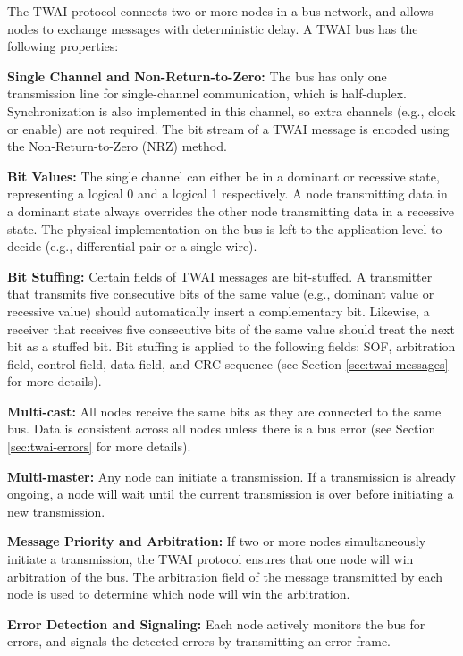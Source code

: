 \documentclass[main\_\_EN.tex]{subfiles}
\begin{document}
The TWAI protocol connects two or more nodes in a bus network, and allows nodes to exchange messages with deterministic delay. A TWAI bus has the following properties:

{\bfseries Single Channel and Non-Return-to-Zero:} The bus has only one transmission line for single-channel communication, which is half-duplex. Synchronization is also implemented in this channel, so extra channels (e.g., clock or enable) are not required. The bit stream of a TWAI message is encoded using the Non-Return-to-Zero (NRZ) method.

{\bfseries Bit Values:} The single channel can either be in a dominant or recessive state, representing a logical 0 and a logical 1 respectively. A node transmitting data in a dominant state always overrides the other node transmitting data in a recessive state. The physical implementation on the bus is left to the application level to decide (e.g., differential pair or a single wire).

{\bfseries Bit Stuffing:} Certain fields of TWAI messages are bit-stuffed. A transmitter that transmits five consecutive bits of the same value (e.g., dominant value or recessive value) should automatically insert a complementary bit. Likewise, a receiver that receives five consecutive bits of the same value should treat the next bit as a stuffed bit. Bit stuffing is applied to the following fields: SOF, arbitration field, control field, data field, and CRC sequence (see Section \ref{sec:twai-messages} for more details).

{\bfseries Multi-cast:} All nodes receive the same bits as they are connected to the same bus. Data is consistent across all nodes unless there is a bus error (see Section \ref{sec:twai-errors} for more details).

{\bfseries Multi-master:} Any node can initiate a transmission. If a transmission is already ongoing, a node will wait until the current transmission is over before initiating a new transmission.

{\bfseries Message Priority and Arbitration:} If two or more nodes simultaneously initiate a transmission, the TWAI protocol ensures that one node will win arbitration of the bus. The arbitration field of the message transmitted by each node is used to determine which node will win the arbitration.

{\bfseries Error Detection and Signaling: } Each node actively monitors the bus for errors, and signals the detected errors by transmitting an error frame.
\end{document}
